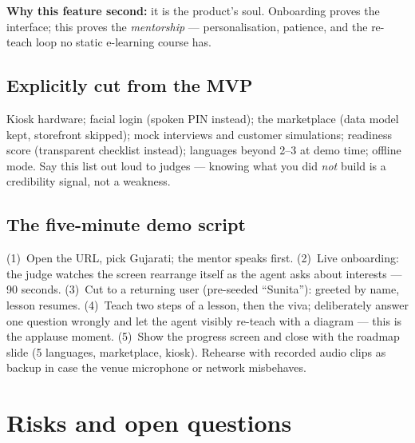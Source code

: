 \documentclass[11pt]{article}
\begin{document}
\textbf{Why this feature second:} it is the product's soul. Onboarding proves the interface; this proves the \emph{mentorship} --- personalisation, patience, and the re-teach loop no static e-learning course has.

\subsection{Explicitly cut from the MVP}

Kiosk hardware; facial login (spoken PIN instead); the marketplace (data model kept, storefront skipped); mock interviews and customer simulations; readiness score (transparent checklist instead); languages beyond 2--3 at demo time; offline mode. Say this list out loud to judges --- knowing what you did \emph{not} build is a credibility signal, not a weakness.

\subsection{The five-minute demo script}

(1)~Open the URL, pick Gujarati; the mentor speaks first. (2)~Live onboarding: the judge watches the screen rearrange itself as the agent asks about interests --- 90 seconds. (3)~Cut to a returning user (pre-seeded ``Sunita''): greeted by name, lesson resumes. (4)~Teach two steps of a lesson, then the viva; deliberately answer one question wrongly and let the agent visibly re-teach with a diagram --- this is the applause moment. (5)~Show the progress screen and close with the roadmap slide (5 languages, marketplace, kiosk). Rehearse with recorded audio clips as backup in case the venue microphone or network misbehaves.

\section{Risks and open questions}
\end{document}
